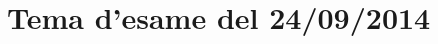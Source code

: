 \documentclass[main.tex]{subfiles}
\begin{document}
\section{Tema d'esame del 24/09/2014}

%

\clearpage

\end{document}
